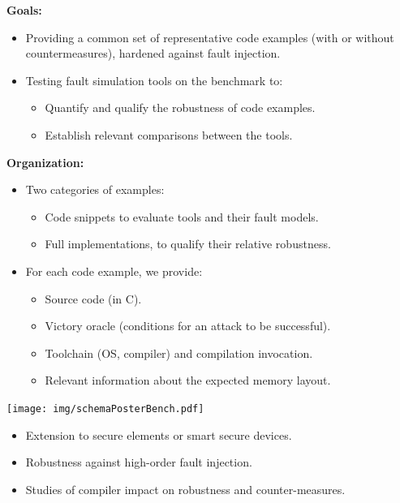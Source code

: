 \documentclass[final]{beamer}
\begin{document}
\begin{frame}[fragile]{}
\begin{columns}[t]
\begin{column}{.49\textwidth}
        \begin{tcolorbox}[colframe=alertTitleBlockColor,
        colback=white,
        adjusted title={\centering \Large Fault simulation benchmark}]
	\textbf{Goals:}
\begin{itemize}
\item Providing a common set of representative code examples (with or without countermeasures), hardened against fault injection.
\item Testing fault simulation tools on the benchmark to:
\begin{itemize}
          \item Quantify and qualify the robustness of code examples.
          \item Establish relevant comparisons between the tools.
          \end{itemize}
\end{itemize}
\vspace{4.5mm}
\textbf{Organization:}
\begin{itemize}
\item Two categories of examples:
\begin{itemize}
          \item Code snippets to evaluate tools and their fault models.
          \item Full implementations, to qualify their relative robustness.
        \end{itemize}
\item For each code example, we provide:
\begin{itemize}
           \item Source code (in C).
           \item Victory oracle (conditions for an attack to be successful).
           \item Toolchain (OS, compiler) and compilation invocation.
           \item Relevant information about the expected memory layout.
           \end{itemize}
\end{itemize}
\vspace{5.5mm}
\centering \texttt{[image: img/schemaPosterBench.pdf]}
        \end{tcolorbox}
\vspace{1.45cm}
        \begin{tcolorbox}[
        adjusted title={\centering \Large Perspectives of SERTIF},
        colframe=exampleBlockColor,
        ]
        \begin{itemize}
\item Extension to secure elements or smart secure devices.
\item Robustness against high-order fault injection.
\item Studies of compiler impact on robustness and counter-measures.
        \end{itemize}
        \end{tcolorbox}


\end{column}
\end{columns}
\end{frame}
\end{document}
